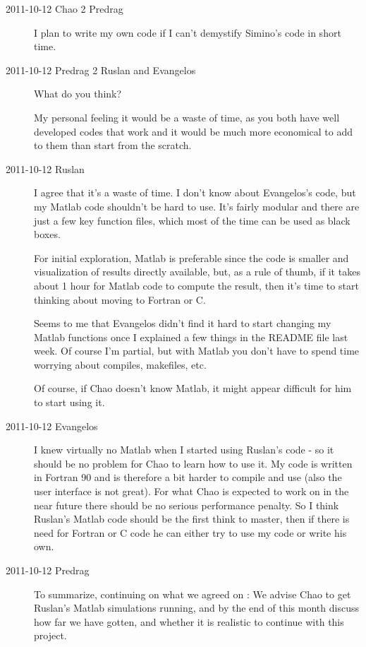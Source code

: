 \begin{description}
\item[2011-10-12 Chao 2 Predrag] I plan to write my own code if I can't demystify
Simino's code in short time.

\item[2011-10-12 Predrag 2 Ruslan and Evangelos]
What do you think?

My personal feeling it would be a waste of time, as you both have well developed
codes that work and
it would be much more economical to add to them than start from the scratch.

\item[2011-10-12 Ruslan]
I agree that it's a waste of time.  I don't know about Evangelos's code,
but my Matlab code shouldn't be hard to use.  It's fairly modular and
there are just a few key function files, which most of the time can
be used as black boxes.

For initial exploration, Matlab is preferable since the code is smaller
and visualization of results directly available, but, as a rule of thumb,
if it takes about 1 hour for Matlab code to compute the result,
then it's time to start thinking about moving to Fortran or C.

Seems to me that Evangelos didn't find it hard to start changing my Matlab
functions once I explained a few things in the README file last week.
Of course I'm partial, but with Matlab you don't have to spend time worrying
about compiles, makefiles, etc.

Of course, if Chao doesn't know Matlab, it might appear difficult
for him to start using it.

\item[2011-10-12 Evangelos]
I knew virtually no Matlab when I started using Ruslan's code
- so it should be no problem for Chao to learn how to use it. My code
is written in Fortran 90 and is therefore a bit harder to compile and
use (also the user interface is not great). For what Chao is expected
to work on in the near future there should be no serious performance
penalty. So I think Ruslan's Matlab code should be the first think to
master, then if there is need for Fortran or C code he can either try
to use my code or write his own.

\item[2011-10-12 Predrag]
To summarize, continuing on what we agreed on :
We advise Chao to get Ruslan's Matlab simulations running, and by the
end of this month discuss how far we have gotten, and
whether it is realistic to continue with this project.


\end{description}
